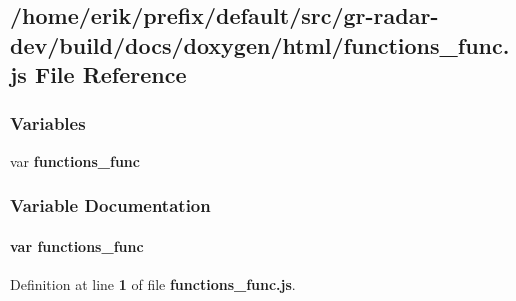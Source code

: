 \subsection{/home/erik/prefix/default/src/gr-\/radar-\/dev/build/docs/doxygen/html/functions\+\_\+func.js File Reference}
\label{functions__func_8js}
\subsubsection*{Variables}
\begin{DoxyCompactItemize}
\item 
var {\bf functions\+\_\+func}
\end{DoxyCompactItemize}


\subsubsection{Variable Documentation}
\paragraph[{functions\+\_\+func}]{\setlength{\rightskip}{0pt plus 5cm}var functions\+\_\+func}\label{functions__func_8js_a653490dc39ab84e827db92787f08a1d9}


Definition at line {\bf 1} of file {\bf functions\+\_\+func.\+js}.

